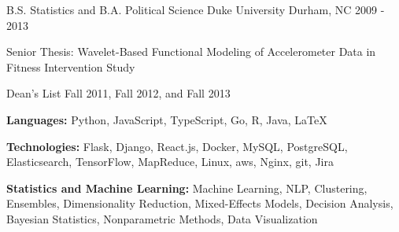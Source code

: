 \documentclass[11pt, a4paper]{awesome-cv}
\begin{document}
\makecvheader

\begin{cventries}
  \vspace{.5 mm}
  \cventry
    {B.S. Statistics and B.A. Political Science}
    {Duke University}
    {Durham, NC}
    {2009 - 2013}
    {
      \begin{cvitems}
        \item{Senior Thesis: Wavelet-Based Functional Modeling of Accelerometer Data
        in Fitness Intervention Study}
        \item{Dean’s List Fall 2011, Fall 2012, and Fall 2013}
      \end{cvitems}
    }
\end{cventries}

\begin{cventries}
  \cventry
    {}
    {}
    {}
    {}
    {
      \begin{cvitems}
        \item{\textbf{Languages:} Python, JavaScript, TypeScript, Go, R, Java, \LaTeX}
        \item{\textbf{Technologies:} Flask, Django, React.js, Docker, MySQL, PostgreSQL, Elasticsearch, TensorFlow, MapReduce, Linux, aws, Nginx, git, Jira}
        \item{\textbf{Statistics and Machine Learning:} Machine Learning, NLP, Clustering, Ensembles, Dimensionality Reduction, Mixed-Effects Models, Decision Analysis, Bayesian Statistics, Nonparametric Methods, Data Visualization}
      \end{cvitems}
    }
\end{cventries}
\end{document}
